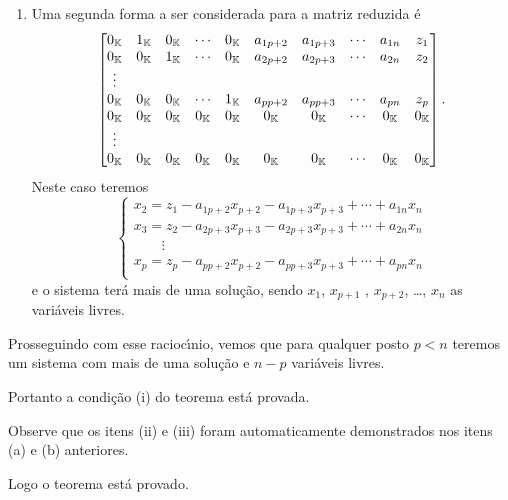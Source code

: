 \begin{prova}
\begin{enumerate}
\begin{enumerate}
\[\begin{cases}
		x_2 = z_2 - a_{2 p + 1}x_{p + 1} - a_{2 p + 2}x_{p + 2} + \cdots + a_{2n}x_{n}\\
		\qquad \vdots\\
		x_p = z_p - a_{p p + 1}x_{p + 1} - a_{p p + 2}x_{p + 2} + \cdots + a_{pn}x_{n}\\
		\end{cases}
		\]
		e o sistema ter\'a mais de uma solu\c{c}\~ao, sendo $x_{p + 1}$ , $x_{p + 2}$, \dots, $x_n$ as vari\'aveis livres.
		\item Uma segunda forma a ser considerada para a matriz reduzida \'e
		\[
		\begin{bmatrix}
		0_{\mathbb{K}} & 1_{\mathbb{K}} & 0_{\mathbb{K}} & \cdots & 0_{\mathbb{K}} & a_{1p+2} & a_{1p+3} & \cdots & a_{1n} & z_1\\
		0_{\mathbb{K}} & 0_{\mathbb{K}} & 1_{\mathbb{K}} & \cdots & 0_{\mathbb{K}} & a_{2p+2} & a_{2p+3} & \cdots & a_{2n} & z_2\\
		\vdots\\
		0_{\mathbb{K}} & 0_{\mathbb{K}} & 0_{\mathbb{K}} & \cdots & 1_{\mathbb{K}} & a_{pp+2} & a_{pp+3} & \cdots & a_{pn} & z_p\\
		0_{\mathbb{K}} & 0_{\mathbb{K}} & 0_{\mathbb{K}} & 0_{\mathbb{K}} & 0_{\mathbb{K}} & 0_{\mathbb{K}} & 0_{\mathbb{K}} & \cdots & 0_{\mathbb{K}} & 0_{\mathbb{K}}\\
		\vdots\\
		0_{\mathbb{K}} & 0_{\mathbb{K}} & 0_{\mathbb{K}} & 0_{\mathbb{K}} & 0_{\mathbb{K}} & 0_{\mathbb{K}} & 0_{\mathbb{K}} & \cdots & 0_{\mathbb{K}}  & 0_{\mathbb{K}}
		\end{bmatrix}.
		\]
		Neste caso teremos
		\[
		\begin{cases}
		x_2 = z_1 - a_{1 p + 2}x_{p + 2} - a_{1 p + 3}x_{p + 3} + \cdots + a_{1n}x_{n}\\
		x_3 = z_2 - a_{2 p + 3}x_{p + 3} - a_{2 p + 3}x_{p + 3} + \cdots + a_{2n}x_{n}\\
		\qquad \vdots\\
		x_p = z_p - a_{p p + 2}x_{p + 2} - a_{p p + 3}x_{p + 3} + \cdots + a_{pn}x_{n}\\
		\end{cases}
		\]
		e o sistema ter\'a mais de uma solu\c{c}\~ao, sendo $x_1$, $x_{p + 1}$ , $x_{p + 2}$, \dots, $x_n$ as vari\'aveis livres.
	\end{enumerate}
	Prosseguindo com esse racioc{\'\i}nio, vemos que para qualquer posto $p < n$ teremos um sistema com mais de uma solu\c{c}\~ao e $n - p$ vari\'aveis livres.
\end{enumerate}
Portanto a condi\c{c}\~ao (i) do teorema est\'a provada.

Observe que os itens (ii) e (iii) foram automaticamente demonstrados nos itens (a) e (b) anteriores.

Logo o teorema est\'a provado.
\end{prova}

